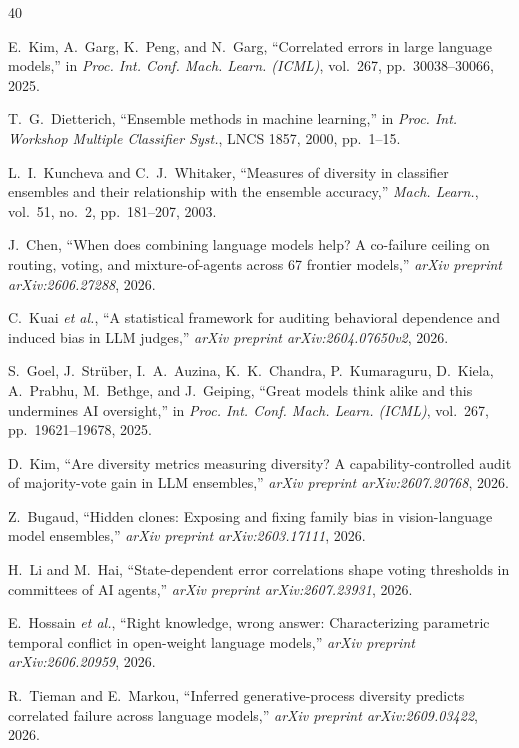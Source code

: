\documentclass{ieeeaccess}
\theoremstyle{definition}
\theoremstyle{plain}
\begin{document}
\begin{thebibliography}{40}

 E.~Kim, A.~Garg, K.~Peng, and N.~Garg, ``Correlated errors in
large language models,'' in \emph{Proc. Int. Conf. Mach. Learn. (ICML)},
vol.~267, pp.~30038--30066, 2025.

 T.~G.~Dietterich, ``Ensemble methods in machine
learning,'' in \emph{Proc. Int. Workshop Multiple Classifier Syst.}, LNCS 1857,
2000, pp.~1--15.

 L.~I.~Kuncheva and C.~J.~Whitaker, ``Measures of
diversity in classifier ensembles and their relationship with the ensemble
accuracy,'' \emph{Mach. Learn.}, vol.~51, no.~2, pp.~181--207, 2003.

 J.~Chen, ``When does combining language models help? A
co-failure ceiling on routing, voting, and mixture-of-agents across 67 frontier
models,'' \emph{arXiv preprint arXiv:2606.27288}, 2026.

 C.~Kuai \emph{et al.}, ``A statistical framework for auditing
behavioral dependence and induced bias in LLM judges,'' \emph{arXiv preprint
arXiv:2604.07650v2}, 2026.

 S.~Goel, J.~Str\"uber, I.~A.~Auzina, K.~K.~Chandra,
P.~Kumaraguru, D.~Kiela, A.~Prabhu, M.~Bethge, and J.~Geiping, ``Great models
think alike and this undermines AI oversight,'' in \emph{Proc. Int. Conf. Mach.
Learn. (ICML)}, vol.~267, pp.~19621--19678, 2025.

 D.~Kim, ``Are diversity metrics measuring diversity? A
capability-controlled audit of majority-vote gain in LLM ensembles,''
\emph{arXiv preprint arXiv:2607.20768}, 2026.

 Z.~Bugaud, ``Hidden clones: Exposing and fixing family bias
in vision-language model ensembles,'' \emph{arXiv preprint arXiv:2603.17111}, 2026.

 H.~Li and M.~Hai, ``State-dependent error correlations shape
voting thresholds in committees of AI agents,'' \emph{arXiv preprint
arXiv:2607.23931}, 2026.

 E.~Hossain \emph{et al.}, ``Right knowledge, wrong answer:
Characterizing parametric temporal conflict in open-weight language models,''
\emph{arXiv preprint arXiv:2606.20959}, 2026.

 R.~Tieman and E.~Markou, ``Inferred generative-process
diversity predicts correlated failure across language models,'' \emph{arXiv
preprint arXiv:2609.03422}, 2026.


\end{thebibliography}
\end{document}
